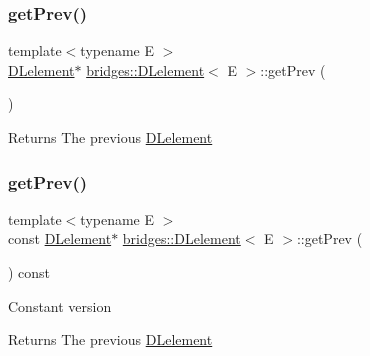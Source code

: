 \subsubsection{\texorpdfstring{get\+Prev()}{getPrev()}\hspace{0.1cm}{\footnotesize\ttfamily [1/2]}}
{\footnotesize\ttfamily template$<$typename E $>$ \\
\mbox{\hyperlink{classbridges_1_1_d_lelement}{D\+Lelement}}$\ast$ \mbox{\hyperlink{classbridges_1_1_d_lelement}{bridges\+::\+D\+Lelement}}$<$ E $>$\+::get\+Prev (\begin{DoxyParamCaption}{ }\end{DoxyParamCaption})\hspace{0.3cm}{\ttfamily [inline]}}

\begin{DoxyReturn}{Returns}
The previous \mbox{\hyperlink{classbridges_1_1_d_lelement}{D\+Lelement}} 
\end{DoxyReturn}
\mbox{\label{classbridges_1_1_d_lelement_a6b46ea401b8192e9043f0493adcec63e}} 
\subsubsection{\texorpdfstring{get\+Prev()}{getPrev()}\hspace{0.1cm}{\footnotesize\ttfamily [2/2]}}
{\footnotesize\ttfamily template$<$typename E $>$ \\
const \mbox{\hyperlink{classbridges_1_1_d_lelement}{D\+Lelement}}$\ast$ \mbox{\hyperlink{classbridges_1_1_d_lelement}{bridges\+::\+D\+Lelement}}$<$ E $>$\+::get\+Prev (\begin{DoxyParamCaption}{ }\end{DoxyParamCaption}) const\hspace{0.3cm}{\ttfamily [inline]}}

Constant version

\begin{DoxyReturn}{Returns}
The previous \mbox{\hyperlink{classbridges_1_1_d_lelement}{D\+Lelement}} 
\end{DoxyReturn}
\mbox{\label{classbridges_1_1_d_lelement_aba19c60b1d10c145b1b737f9134f4497}} 
